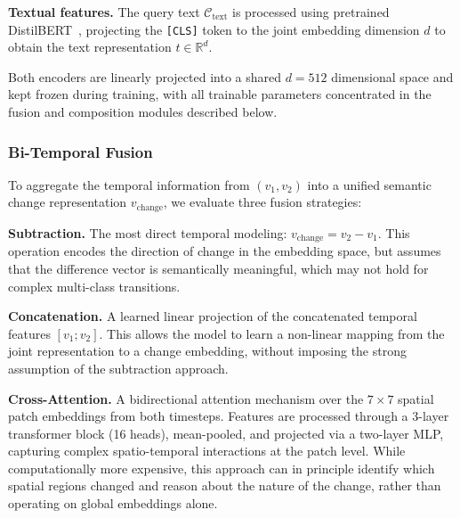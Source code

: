 \textbf{Textual features.} The query text
$\mathcal{C}_\text{text}$ is processed using pretrained
DistilBERT~\cite{sanh2019distilbert}, projecting the
\texttt{[CLS]} token to the joint embedding dimension $d$
to obtain the text representation $t \in \mathbb{R}^d$.
 
Both encoders are linearly projected into a shared $d = 512$
dimensional space and kept frozen during training, with all
trainable parameters concentrated in the fusion and
composition modules described below.
 
\subsubsection{Bi-Temporal Fusion}
\label{sec:chap7_unictr_fusion}
 
To aggregate the temporal information from $(v_1, v_2)$
into a unified semantic change representation
$v_\text{change}$, we evaluate three fusion strategies:
 
\textbf{Subtraction.} The most direct temporal modeling:
$v_\text{change} = v_2 - v_1$. This operation encodes the
direction of change in the embedding space, but assumes
that the difference vector is semantically meaningful, which
may not hold for complex multi-class transitions.
 
\textbf{Concatenation.} A learned linear projection of the
concatenated temporal features $[v_1; v_2]$. This allows
the model to learn a non-linear mapping from the joint
representation to a change embedding, without imposing the
strong assumption of the subtraction approach.
 
\textbf{Cross-Attention.} A bidirectional attention
mechanism over the $7 \times 7$ spatial patch embeddings
from both timesteps. Features are processed through a
3-layer transformer block (16 heads), mean-pooled, and
projected via a two-layer MLP, capturing complex
spatio-temporal interactions at the patch level. While
computationally more expensive, this approach can in
principle identify which spatial regions changed and reason
about the nature of the change, rather than operating on
global embeddings alone.
 
 

